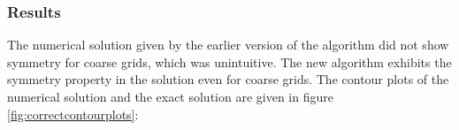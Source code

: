 \documentclass[a4paper,12pt]{article}
\makeatletter
\newenvironment{figurehere}
  {\def\@captype{figure}}
  {}
\makeatother
\begin{document}
\subsubsection{Results}
The numerical solution given by the earlier version of the algorithm did not show symmetry for coarse grids, which was unintuitive. The new algorithm exhibits the symmetry property in the solution even for coarse grids. The contour plots of the numerical solution and the exact solution are given in figure \ref{fig:correctcontourplots}:
\begin{center}
\begin{figurehere}
\\

\end{figurehere}
\end{center}
\end{document}
